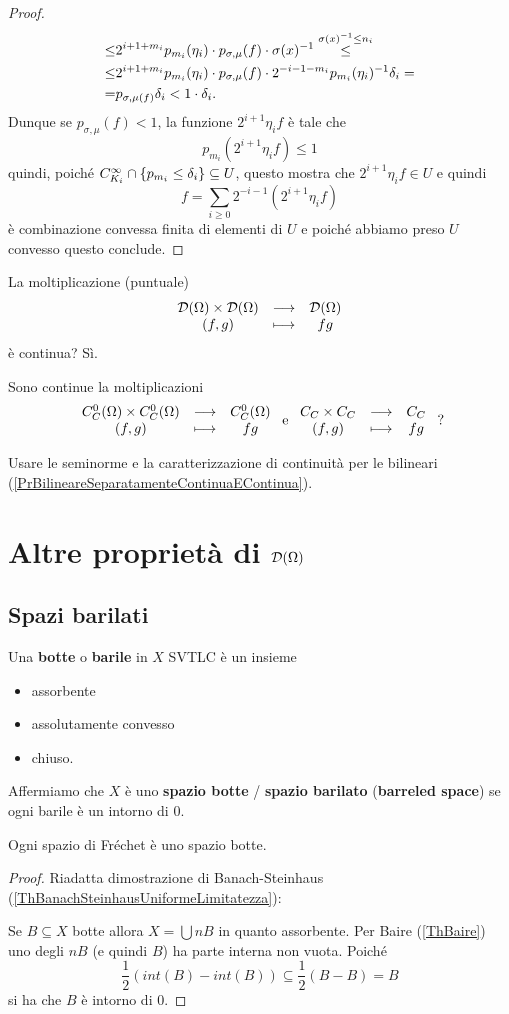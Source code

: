 \begin{proof}
\begin{align*}
    \leq&2^{i+1+m_i}p_{m_i}(\eta_i)\cdot p_{\sigma,\mu}(f)\cdot \sigma(x)^{-1}\overset{\sigma(x)^{-1}\leq n_i}{\leq}\\
    \leq&2^{i+1+m_i}p_{m_i}(\eta_i)\cdot p_{\sigma,\mu}(f)\cdot2^{-i-1-m_i}p_{m_i}(\eta_i)^{-1}\delta_i=\\
    =&p_{\sigma,\mu(f)}\delta_i<1\cdot \delta_i.
\end{align*}
Dunque se $p_{\sigma,\mu}(f)<1$, la funzione $2^{i+1}\eta_i f$ \`e tale che
\[p_{m_i}(2^{i+1}\eta_i f)\leq 1\]
quindi, poich\'e $C^\infty_{K_i}\cap\left\{{p_{m_i}\leq \delta_i}\right\}\subseteq U$, questo mostra che $2^{i+1}\eta_i f\in U$ e quindi
\[f=\sum_{i\geq 0}2^{-i-1}(2^{i+1}\eta_i f)\]
\`e combinazione convessa finita di elementi di $U$ e poich\'e abbiamo preso $U$ convesso questo conclude.
\end{proof}

\begin{exercise}
La moltiplicazione (puntuale)
\[\begin{array}{ccc} {\mathcal{D}(\Omega)\times\mathcal{D}(\Omega)} & \longrightarrow & {\mathcal{D}(\Omega)}\\ {(f,g)} & \longmapsto & {fg} \end{array}\]
\`e continua? S\`i.

Sono continue la moltiplicazioni
\[\begin{array}{ccc} {C^0_C(\Omega)\times C^0_C(\Omega)} & \longrightarrow & {C^0_C(\Omega)}\\ {(f,g)} & \longmapsto & {fg} \end{array}\text{ e }\begin{array}{ccc} {C_C\times C_C} & \longrightarrow & {C_C}\\ {(f,g)} & \longmapsto & {fg} \end{array}\text{ ?}\]
\end{exercise}
\begin{solution}
Usare le seminorme e la caratterizzazione di continuit\`a per le bilineari (\ref{PrBilineareSeparatamenteContinuaEContinua}).
\end{solution}


\section{Altre propriet\`a di \texorpdfstring{$\mathcal{D}(\Omega)$}{DOmega}}
\subsection{Spazi barilati}
\begin{definition}
Una \textbf{botte} o \textbf{barile} in $X$ SVTLC \`e un insieme
\begin{itemize}
    \item assorbente
    \item assolutamente convesso
    \item chiuso.
\end{itemize}
Affermiamo che $X$ \`e uno \textbf{spazio botte} / \textbf{spazio barilato} (\textbf{barreled space}) se ogni barile \`e un intorno di $0$.
\end{definition}
\begin{remark}
Ogni spazio di Fr\'echet \`e uno spazio botte.
\end{remark}
\begin{proof}
Riadatta dimostrazione di Banach-Steinhaus (\ref{ThBanachSteinhausUniformeLimitatezza}): 

\noindent
Se $B\subseteq X$ botte allora $X=\bigcup nB$ in quanto assorbente. Per Baire (\ref{ThBaire}) uno degli $nB$ (e quindi $B$) ha parte interna non vuota. Poich\'e 
\[\frac12 (int(B)-int(B))\subseteq \frac12(B-B)=B\]
si ha che $B$ \`e intorno di $0$.
\end{proof}

